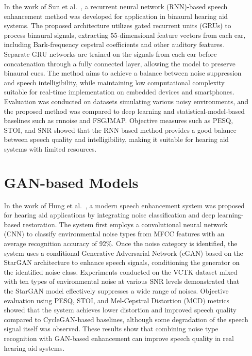\vspace{1em}

In the work of Sun et al.~\cite{sun2021rnn}, a recurrent neural network (RNN)-based speech enhancement method was developed for application in binaural hearing aid systems. The proposed architecture utilizes gated recurrent units (GRUs) to process binaural signals, extracting 55-dimensional feature vectors from each ear, including Bark-frequency cepstral coefficients and other auditory features. Separate GRU networks are trained on the signals from each ear before concatenation through a fully connected layer, allowing the model to preserve binaural cues. The method aims to achieve a balance between noise suppression and speech intelligibility, while maintaining low computational complexity suitable for real-time implementation on embedded devices and smartphones. Evaluation was conducted on datasets simulating various noisy environments, and the proposed method was compared to deep learning and statistical-model-based baselines such as rnnoise and FSGJMAP. Objective measures such as PESQ, STOI, and SNR showed that the RNN-based method provides a good balance between speech quality and intelligibility, making it suitable for hearing aid systems with limited resources.



\section{GAN-based Models}

In the work of Hung et al.~\cite{hung2024integrating}, a modern speech enhancement system was proposed for hearing aid applications by integrating noise classification and deep learning-based restoration. The system first employs a convolutional neural network (CNN) to classify environmental noise types from MFCC features with an average recognition accuracy of 92\%. Once the noise category is identified, the system uses a conditional Generative Adversarial Network (cGAN) based on the StarGAN architecture to enhance speech signals, conditioning the generator on the identified noise class. Experiments conducted on the VCTK dataset mixed with ten types of environmental noise at various SNR levels demonstrated that the StarGAN model effectively suppresses a wide range of noises. Objective evaluation using PESQ, STOI, and Mel-Cepstral Distortion (MCD) metrics showed that the system achieves lower distortion and improved speech quality compared to CycleGAN-based baselines, although some degradation of the speech signal itself was observed. These results show that combining noise type recognition with GAN-based enhancement can improve speech quality in real hearing aid systems.

